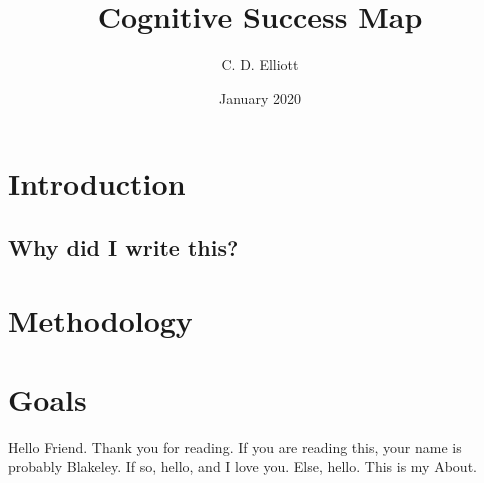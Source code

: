 \documentclass[12pt]{article}
\title{Cognitive Success Map}
\author{C. D. Elliott}
\date{January 2020}
\begin{document}
\maketitle
\tableofcontents

\newpage
\section{Introduction}
\subsection{}
\subsection{Why did I write this?}
\section{Methodology}
\section{Goals}

\newpage
Hello Friend. Thank you for reading. If you are reading this, your name is probably Blakeley. If so, hello, and I love you. Else, hello. This is my About.
\end{document}
